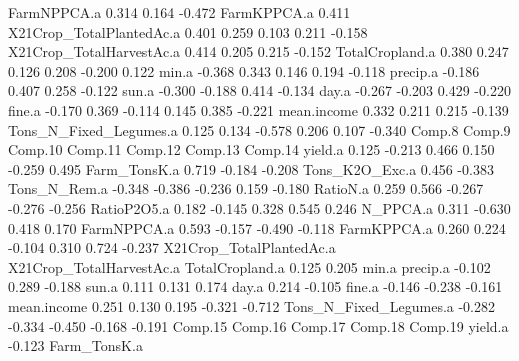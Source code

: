 \documentclass{report}
\begin{document}
\begin{Schunk}
\begin{Soutput}
FarmNPPCA.a                      0.314  0.164                      -0.472
FarmKPPCA.a                      0.411                                   
X21Crop_TotalPlantedAc.a  0.401         0.259  0.103  0.211 -0.158       
X21Crop_TotalHarvestAc.a  0.414         0.205         0.215 -0.152       
TotalCropland.a           0.380         0.247  0.126  0.208 -0.200  0.122
min.a                    -0.368         0.343  0.146  0.194 -0.118       
precip.a                 -0.186  0.407                0.258 -0.122       
sun.a                    -0.300 -0.188  0.414                      -0.134
day.a                    -0.267 -0.203  0.429                      -0.220
fine.a                   -0.170  0.369 -0.114  0.145  0.385 -0.221       
mean.income               0.332         0.211                0.215 -0.139
Tons_N_Fixed_Legumes.a           0.125  0.134 -0.578  0.206  0.107 -0.340
                         Comp.8 Comp.9 Comp.10 Comp.11 Comp.12 Comp.13 Comp.14
yield.a                          0.125 -0.213   0.466   0.150  -0.259   0.495 
Farm_TonsK.a              0.719        -0.184                  -0.208         
Tons_K2O_Exc.a            0.456 -0.383                                        
Tons_N_Rem.a                    -0.348 -0.386  -0.236           0.159  -0.180 
RatioN.a                  0.259  0.566 -0.267  -0.276  -0.256                 
RatioP2O5.a               0.182 -0.145  0.328           0.545   0.246         
N_PPCA.a                         0.311         -0.630   0.418           0.170 
FarmNPPCA.a                             0.593  -0.157  -0.490  -0.118         
FarmKPPCA.a               0.260  0.224 -0.104   0.310           0.724  -0.237 
X21Crop_TotalPlantedAc.a                                                      
X21Crop_TotalHarvestAc.a                                                      
TotalCropland.a                                                 0.125   0.205 
min.a                                                                         
precip.a                        -0.102                  0.289  -0.188         
sun.a                                           0.111           0.131   0.174 
day.a                                           0.214          -0.105         
fine.a                          -0.146                         -0.238  -0.161 
mean.income                      0.251          0.130   0.195  -0.321  -0.712 
Tons_N_Fixed_Legumes.a   -0.282 -0.334 -0.450  -0.168  -0.191                 
                         Comp.15 Comp.16 Comp.17 Comp.18 Comp.19
yield.a                  -0.123                                 
Farm_TonsK.a                                                    

\end{Soutput}
\end{Schunk}
\end{document}
